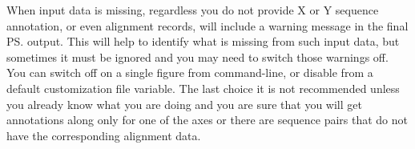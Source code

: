    { {\tbdef} }
%
   { {\tbdef} }
%
   { {\tbdef} }
%
   { {\tbdef} }
%
   { {\tbdef} }
%
   { {\tbdef} }
%
   { {\tbdef} }
%
   { {\tbdef} }
%
   { {\tbdef} }
%
   { {\tbdef} }
%
   { {\tbdef} }
%
   { {\tbdef} }
%
   { {\tbdef} }
%
   { When input data is missing, regardless you do not provide X or Y sequence annotation, or even alignment records, {\prog} will include a warning message in the final {\ps} output. This will help to identify what is missing from such input data, but sometimes it must be ignored and you may need to switch those warnings off. You can switch off on a single figure from command-line, or disable from a default customization file variable. The last choice it is not recommended unless you already know what you are doing and you are sure that you will get annotations along only for one of the axes or there are sequence pairs that do not have the corresponding alignment data. }
